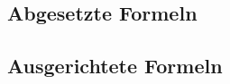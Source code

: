\documentclass[12pt, a4paper, sectionentrydots=true, listof=totoc, listof=entryprefix, numbers=endperiod]{scrartcl}
\newcounter{SeitenzahlSpeicherRoman}
\begin{document}
\subsection{Abgesetzte Formeln}
\begin{spacing}{1.25}

\end{spacing}
%
%
\subsection{Ausgerichtete Formeln}
\begin{spacing}{1.25}

\end{spacing}
%
%
%
%
%
%
%
%
%
%
%
\pagebreak 
\clearpage
{}
\setcounter{page}{\theSeitenzahlSpeicherRoman}
\addtocounter{page}{1}
\ofoot{\thepage{}}
%
%
%
%
%
\clearpage
\end{document}
